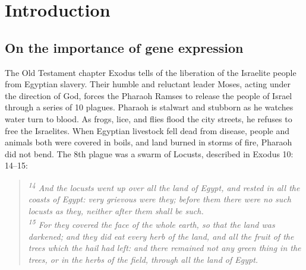 \chapter{Introduction} %
\label{Chapter1} %

\label{geneNames}
\newcommand\slo{\textit{slo1}}
\newcommand\fn{\textit{Fn1}}
\newcommand\kcnma{\textit{Kcnma}}
\newcommand\dscam{\textit{Dscam1}}

\section{On the importance of gene expression} %

The Old Testament chapter Exodus tells of the liberation of the Israelite people from Egyptian slavery. Their humble and reluctant leader Moses, acting under the direction of God, forces the Pharaoh Ramses to release the people of Israel through a series of 10 plagues. Pharaoh is stalwart and stubborn as he watches water turn to blood. As frogs, lice, and flies flood the city streets, he refuses to free the Israelites. When Egyptian livestock fell dead from disease,   people and animals both were covered in boils, and land burned in storms of fire, Pharaoh did not bend. The 8th plague was a swarm of Locusts, described in Exodus 10: 14–15:

\begin{quote}
	\itshape %
	\singlespacing
	\textsuperscript{14} And the locusts went up over all the land of Egypt, and rested in all the coasts of Egypt: very grievous were they; before them there were no such locusts as they, neither after them shall be such.\\
	\textsuperscript{15} For they covered the face of the whole earth, so that the land was darkened; and they did eat every herb of the land, and all the fruit of the trees which the hail had left: and there remained not any green thing in the trees, or in the herbs of the field, through all the land of Egypt.
\end{quote}


